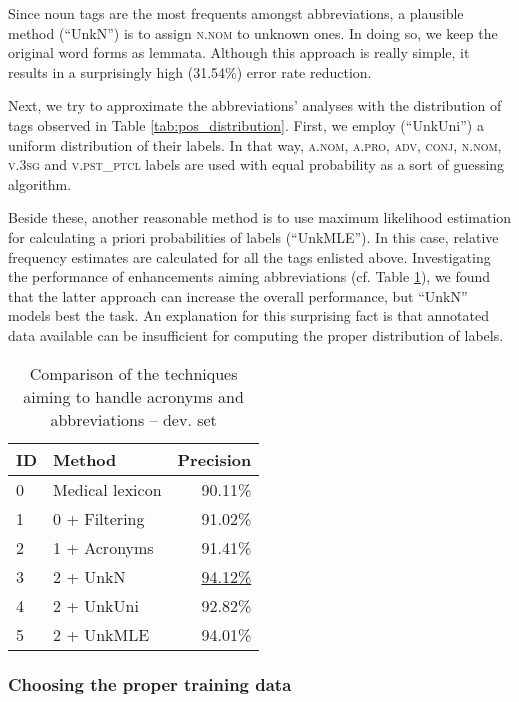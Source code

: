 Since noun tags are the most frequents amongst abbreviations, a plausible method (``UnkN'') is to assign \textsc{n.nom} to unknown ones. 
In doing so, we keep the original word forms as lemmata. 
Although this approach is really simple, it results in a surprisingly high (31.54\%) error rate reduction. 

Next, we try to approximate the abbreviations' analyses with the distribution of tags observed in Table \ref{tab:pos_distribution}. 
First, we employ (``UnkUni'') a uniform distribution of their labels.%
In that way, \textsc{a.nom}, \textsc{a.pro}, \textsc{adv}, \textsc{conj}, \textsc{n.nom}, \textsc{v.3sg} and \textsc{v.pst\_ptcl} labels are used with equal probability as a sort of guessing algorithm.

Beside these, another reasonable method is to use maximum likelihood estimation for calculating a priori probabilities of labels (``UnkMLE''). 
In this case, relative frequency estimates are calculated for all the tags enlisted above.
Investigating the performance of enhancements aiming abbreviations (cf. Table \ref{tab:abbrev_fixes}), we found that the latter approach can increase the overall performance, but ``UnkN'' models best the task. An explanation for this surprising fact is that annotated data available can be insufficient for computing the proper distribution of labels.

\begin{table}[h]
\centering
\caption{Comparison of the techniques aiming to handle acronyms and abbreviations --  dev. set}
\label{tab:abbrev_fixes}
\begin{tabular}{ l l r } 
\hline
ID & Method &  Precision \\
\hline
0 & Medical lexicon & 90.11\% \\
1 & 0 + Filtering & 91.02\% \\
2 & 1 + Acronyms & 91.41\% \\
3 & 2 + UnkN & \underline{94.12\%} \\
4 & 2 + UnkUni & 92.82\% \\
5 & 2 + UnkMLE & 94.01\% \\
\hline
\end{tabular}
\end{table}

\subsubsection{Choosing the proper training data}

